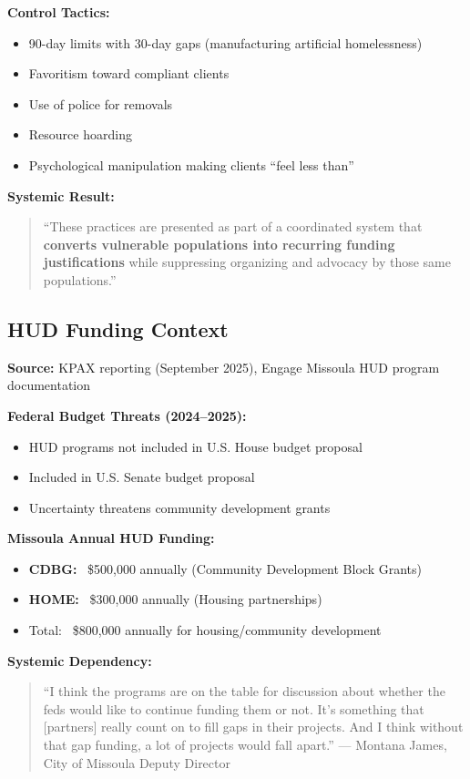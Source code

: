 \documentclass[11pt,letterpaper]{article}
\newenvironment{testimony}{%
    \begin{quote}\itshape\color{DarkGray}%
}{%
    \end{quote}%
}
\begin{document}
\textbf{Control Tactics:}
\begin{itemize}[leftmargin=*]
\item 90-day limits with 30-day gaps (manufacturing artificial homelessness)
\item Favoritism toward compliant clients
\item Use of police for removals
\item Resource hoarding
\item Psychological manipulation making clients ``feel less than''
\end{itemize}

\textbf{Systemic Result:}
\begin{testimony}
``These practices are presented as part of a coordinated system that \textbf{converts vulnerable populations into recurring funding justifications} while suppressing organizing and advocacy by those same populations.''
\end{testimony}

\subsection{HUD Funding Context}

\textbf{Source:} KPAX reporting (September 2025), Engage Missoula HUD program documentation

\textbf{Federal Budget Threats (2024--2025):}
\begin{itemize}[leftmargin=*]
\item HUD programs not included in U.S. House budget proposal
\item Included in U.S. Senate budget proposal
\item Uncertainty threatens community development grants
\end{itemize}

\textbf{Missoula Annual HUD Funding:}
\begin{itemize}[leftmargin=*]
\item \textbf{CDBG:} ~\$500,000 annually (Community Development Block Grants)
\item \textbf{HOME:} ~\$300,000 annually (Housing partnerships)
\item Total: ~\$800,000 annually for housing/community development
\end{itemize}

\textbf{Systemic Dependency:}
\begin{testimony}
``I think the programs are on the table for discussion about whether the feds would like to continue funding them or not. It's something that [partners] really count on to fill gaps in their projects. And I think without that gap funding, a lot of projects would fall apart.'' --- Montana James, City of Missoula Deputy Director
\end{testimony}
\end{document}

